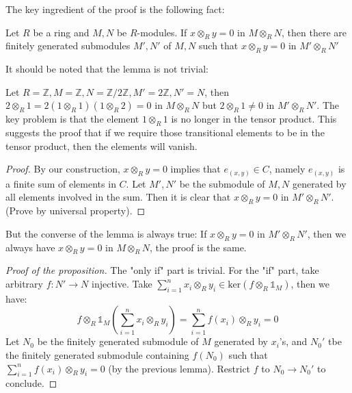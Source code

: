 \documentclass{note-eng}
\begin{document}
The key ingredient of the proof is the following fact:

\begin{lemma}
    Let $R$ be a ring and $M, N$ be $R$-modules. If $x \otimes_R y = 0$ in $M \otimes_R N$, then there are finitely generated submodules $M', N'$ of $M, N$ such that $x \otimes_R y = 0$ in $M' \otimes_R N'$
\end{lemma}

It should be noted that the lemma is not trivial:

\begin{example}
    Let $R = \mathbb{Z}, M = \mathbb{Z}, N = \mathbb{Z} / 2 \mathbb{Z}, M' = 2 \mathbb{Z}, N' = N$, then $2 \otimes_R 1 = 2 (1 \otimes_R 1) (1 \otimes_R 2) = 0$ in $M \otimes_R N$ but $2 \otimes_R 1 \ne 0$ in $M' \otimes_R N'$. The key problem is that the element $1 \otimes_R 1$ is no longer in the tensor product. This suggests the proof that if we require those transitional elements to be in the tensor product, then the elements will vanish.
\end{example}

\begin{proof}
    By our construction, $x \otimes_R y = 0$ implies that $e_{(x, y)} \in C$, namely $e_{(x, y)}$ is a finite sum of elements in $C$. Let $M', N'$ be the submodule of $M, N$ generated by all elements involved in the sum. Then it is clear that $x \otimes_R y = 0$ in $M' \otimes_R N'$. (\TODO Prove by universal property).
\end{proof}

But the converse of the lemma is always true: If $x \otimes_R y = 0$ in $M' \otimes_R N'$, then we always have $x \otimes_R y = 0$ in $M \otimes_R N$, the proof is the same.

\begin{proof}[Proof of the proposition]
    The "only if" part is trivial. For the "if" part, take arbitrary $f: N' \rightarrow N$ injective. Take $\sum\limits_{i = 1}^{n} x_i \otimes_R y_i \in \mathrm{ker}(f \otimes_R \mathds{1}_M)$, then we have:
    $$f \otimes_R \mathds{1}_M\left(\sum\limits_{i = 1}^{n} x_i \otimes_R y_i\right) = \sum\limits_{i = 1}^{n} f(x_i) \otimes_R y_i = 0$$
    Let $N_0$ be the finitely generated submodule of $M$ generated by $x_i$'s, and $N_0'$ tbe the finitely generated submodule containing $f(N_0)$ such that $\sum\limits_{i = 1}^{n} f(x_i) \otimes_R y_i = 0$ (by the previous lemma). Restrict $f$ to $N_0 \rightarrow N_0'$ to conclude.
\end{proof}
\end{document}
